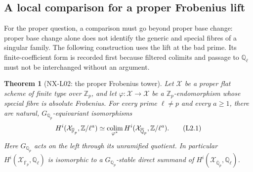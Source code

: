 \documentclass[11pt]{article}
\newtheorem{theorem}{Theorem}[section]
\theoremstyle{remark}
\begin{document}
\subsection{A local comparison for a proper Frobenius lift}

For the proper question, a comparison must go beyond proper base
change: proper base change alone does not identify the generic and
special fibres of a singular family.  The following construction uses
the lift at the bad prime.  Its finite-coefficient form is recorded
first because filtered colimits and passage to $\mathbb Q_\ell$ must
not be interchanged without an argument.

\begin{theorem}[NX-L02: the proper Frobenius tower]
\label{NX-L02}
Let $\mathcal X$ be a proper flat scheme of finite type over
$\mathbb Z_p$, and let $\varphi:\mathcal X\to\mathcal X$ be a
$\mathbb Z_p$-endomorphism whose special fibre is absolute Frobenius.
For every prime $\ell\ne p$ and every $a\geq1$, there are natural,
$G_{\mathbb Q_p}$-equivariant isomorphisms
\[
 H^i(\mathcal X_{\overline{\mathbb F}_p},\mathbb Z/\ell^a)
 \simeq
 \mathop{\rm colim}_{\varphi^*}
 H^i(\mathcal X_{\overline{\mathbb Q}_p},\mathbb Z/\ell^a).
 \tag{L2.1}
\]
Here $G_{\mathbb Q_p}$ acts on the left through its unramified
quotient.  In particular
$H^i(\mathcal X_{\overline{\mathbb F}_p},\mathbb Q_\ell)$ is
isomorphic to a $G_{\mathbb Q_p}$-stable direct summand of
$H^i(\mathcal X_{\overline{\mathbb Q}_p},\mathbb Q_\ell)$.
\end{theorem}
\end{document}
